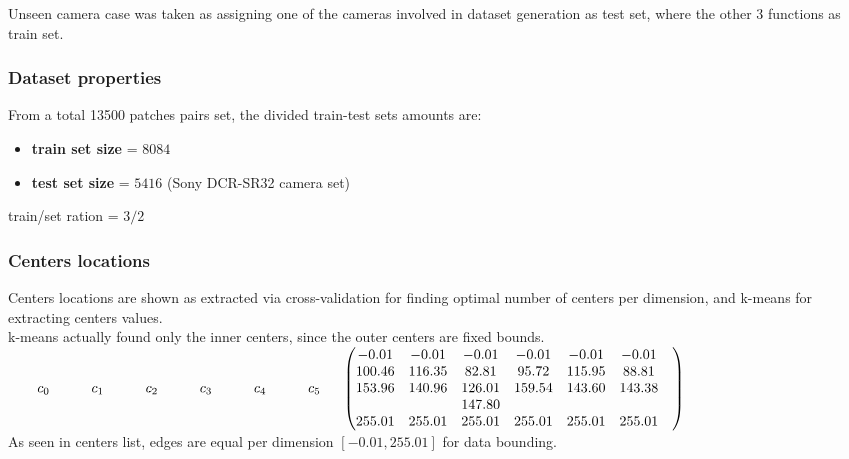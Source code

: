 Unseen camera case was taken as assigning one of the cameras involved in dataset generation as test set, where the other 3 functions as train set.


	\subsubsection{Dataset properties}
	
		From a total 13500 patches pairs set, the divided train-test sets amounts are:
		\begin{itemize}
			\item \textbf{train set size} = $8084$ 
			\item \textbf{test set size} = $5416$ (Sony DCR-SR32 camera set)
		\end{itemize}
		
		train/set ration = $3/2$

	\subsubsection{Centers locations}
	
	Centers locations are shown as extracted via cross-validation for finding optimal number of centers per dimension, and k-means for extracting centers values. \\
	k-means actually found only the inner centers, since the outer centers are fixed bounds.\\


	$
	\begin{matrix}  \qquad  c_0 \quad  \qquad c_1 \quad  \qquad c_2 \qquad \quad  c_3 \qquad \quad c_4 \qquad \quad c_5 \quad \end{matrix}\\
			
	
	\begin{pmatrix}
			     -0.01 &     -0.01 &    -0.01 & -0.01   & -0.01   & -0.01    \\
				100.46 &   116.35 &    82.81 &    95.72 & 115.95 & 88.81     \\
				153.96 &   140.96 &   126.01 &   159.54 & 143.60 & 143.38    \\
				       &          &   147.80 &          &        &             \\
	     		 255.01 &  255.01 &   255.01 &   255.01 &  255.01 &  255.01 & \\
			\end{pmatrix}
	$ 
\\
	

	As seen in centers list, edges are equal per dimension $[-0.01 , 255.01]$ for data bounding.\\
	
